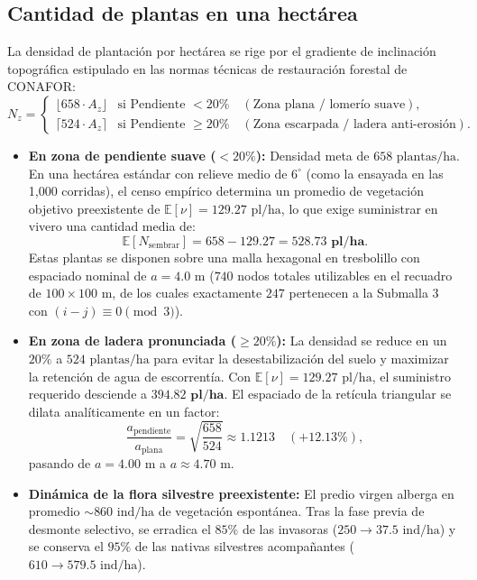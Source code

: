 \documentclass[11pt,a4paper]{article}
\begin{document}
\subsection{Cantidad de plantas en una hectárea}
La densidad de plantación por hectárea se rige por el gradiente de inclinación topográfica estipulado en las normas técnicas de restauración forestal de CONAFOR:
\begin{equation}
N_z = \begin{cases}
\lfloor 658 \cdot A_z \rfloor & \text{si } \text{Pendiente } < 20\% \quad (\text{Zona plana / lomerío suave}), \\
\lceil 524 \cdot A_z \rceil & \text{si } \text{Pendiente } \ge 20\% \quad (\text{Zona escarpada / ladera anti-erosión}).
\end{cases}
\end{equation}

\begin{itemize}[leftmargin=1.5em]
    \item \textbf{En zona de pendiente suave ($< 20\%$):} Densidad meta de \textbf{$658\text{ plantas/ha}$}. En una hectárea estándar con relieve medio de $6^\circ$ (como la ensayada en las 1,000 corridas), el censo empírico determina un promedio de vegetación objetivo preexistente de $\mathbb{E}[\nu] = 129.27\text{ pl/ha}$, lo que exige suministrar en vivero una cantidad media de:
    \begin{equation}
    \mathbb{E}[N_{\text{sembrar}}] = 658 - 129.27 = \mathbf{528.73\text{ pl/ha}}.
    \end{equation}
    Estas plantas se disponen sobre una malla hexagonal en tresbolillo con espaciado nominal de $a = 4.0\text{ m}$ ($740$ nodos totales utilizables en el recuadro de $100\times 100\text{ m}$, de los cuales exactamente $247$ pertenecen a la Submalla 3 con $(i-j)\equiv 0\pmod 3$).
    \item \textbf{En zona de ladera pronunciada ($\ge 20\%$):} La densidad se reduce en un $20\%$ a \textbf{$524\text{ plantas/ha}$} para evitar la desestabilización del suelo y maximizar la retención de agua de escorrentía. Con $\mathbb{E}[\nu] = 129.27\text{ pl/ha}$, el suministro requerido desciende a $\mathbf{394.82\text{ pl/ha}}$. El espaciado de la retícula triangular se dilata analíticamente en un factor:
    \begin{equation}
    \frac{a_{\text{pendiente}}}{a_{\text{plana}}} = \sqrt{\frac{658}{524}} \approx 1.1213 \quad (+12.13\%),
    \end{equation}
    pasando de $a = 4.00\text{ m}$ a $a \approx 4.70\text{ m}$.
    \item \textbf{Dinámica de la flora silvestre preexistente:} El predio virgen alberga en promedio $\sim 860\text{ ind/ha}$ de vegetación espontánea. Tras la fase previa de desmonte selectivo, se erradica el $85\%$ de las invasoras ($250 \to 37.5\text{ ind/ha}$) y se conserva el $95\%$ de las nativas silvestres acompañantes ($610 \to 579.5\text{ ind/ha}$).
\end{itemize}
\end{document}
